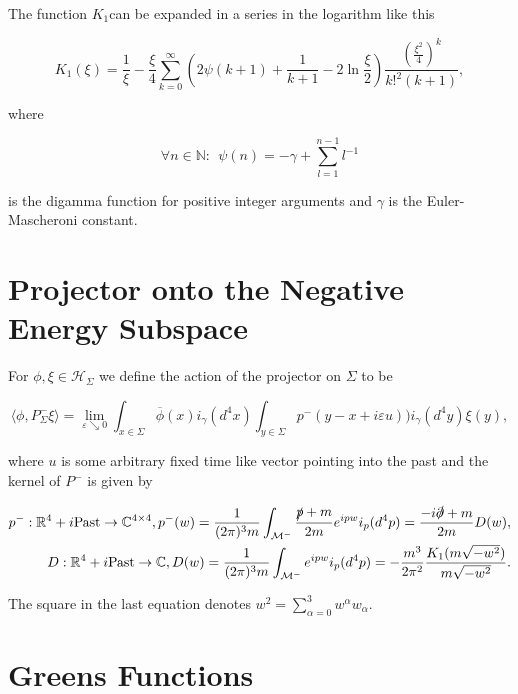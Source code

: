 \documentclass[a4paper,11pt]{article}
\begin{document}
The function \(K_1\)can be expanded in a series in the logarithm like this

\begin{equation}\label{K1series}
K_1(\xi) = \frac{1}{\xi}- \frac{\xi}{4} \sum_{k=0}^\infty \left(2 \psi(k+1)+\frac{1}{k+1}-2 \ln\frac{ \xi}{2} \right) \frac{\left(\frac{\xi^2}{4}\right)^k}{k!^2 (k+1)},
\end{equation}

where

\begin{equation}
\forall n \in \mathbb{N}:~~\psi(n)= -\gamma + \sum_{l=1}^{n-1} l^{-1} 
\end{equation}

is the digamma function for positive integer arguments and \(\gamma\) is the Euler-Mascheroni constant.

\section{Projector onto the Negative Energy Subspace}

For \(\phi,\xi \in \mathcal{H}_\Sigma\) we define the action of the projector on \(\Sigma\) to be

\begin{equation}
\langle \phi, P^-_\Sigma \xi\rangle = \lim_{\varepsilon \searrow 0} \int_{x \in \Sigma} \overline{\phi}(x) i_\gamma (d^4x)
\int_{y \in \Sigma} p^-(y-x+i \varepsilon u)) i_\gamma(d^4 y) \xi (y),
\end{equation}

where \(u\) is some arbitrary fixed time like vector pointing into the past and the kernel of \(P^-\) is given by

\begin{align}
p^-: \mathbb{R}^4+i \text{Past} \rightarrow \mathbb{C}^{4\times 4}, p^-(w) = \frac{1}{(2\pi)^3 m}\int_{\mathcal{M}^-}\frac{\slashed{p} +m}{2m}e^{i pw}i_p(d^4p) = \frac{-i \slashed{\partial}+m}{2m}D(w),\\
D:\mathbb{R}^4+ i \text{Past}\rightarrow \mathbb{C}, D(w)= \frac{1}{(2\pi)^3 m} \int_{\mathcal{M}^-}e^{i pw} i_p(d^4p) = -\frac{m^3}{2\pi^2}\frac{K_1(m \sqrt{-w^2})}{m \sqrt{-w^2}}.
\end{align}

The square in the last equation denotes \(w^2=\sum_{\alpha=0}^3 w^\alpha w_\alpha\).


\section{Greens Functions}
\end{document}
